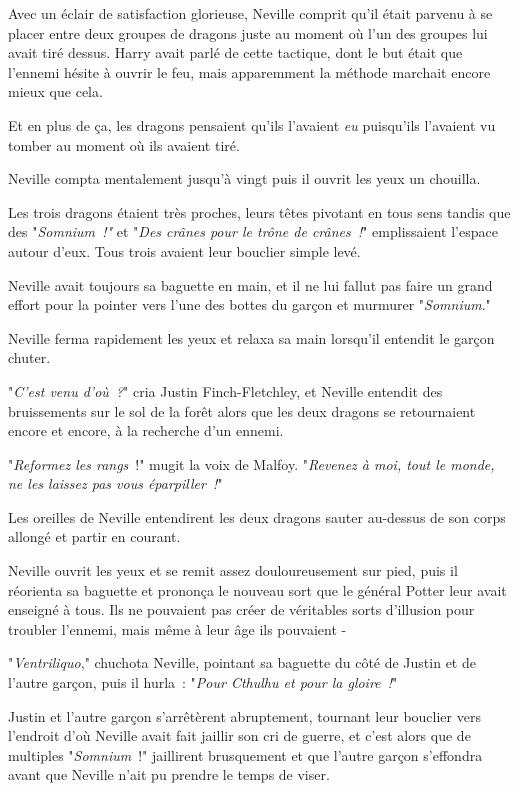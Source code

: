 Avec un éclair de satisfaction glorieuse, Neville comprit qu'il était parvenu à se placer entre deux groupes de dragons juste au moment où l'un des groupes lui avait tiré dessus. Harry avait parlé de cette tactique, dont le but était que l'ennemi hésite à ouvrir le feu, mais apparemment la méthode marchait encore mieux que cela.

Et en plus de ça, les dragons pensaient qu'ils l'avaient \emph{eu} puisqu'ils l'avaient vu tomber au moment où ils avaient tiré.

Neville compta mentalement jusqu'à vingt puis il ouvrit les yeux un chouilla.

Les trois dragons étaient très proches, leurs têtes pivotant en tous sens tandis que des "\emph{Somnium~!"} et "\emph{Des crânes pour le trône de crânes~!}" emplissaient l'espace autour d'eux. Tous trois avaient leur bouclier simple levé.

Neville avait toujours sa baguette en main, et il ne lui fallut pas faire un grand effort pour la pointer vers l'une des bottes du garçon et murmurer "\emph{Somnium}."

Neville ferma rapidement les yeux et relaxa sa main lorsqu'il entendit le garçon chuter.

"\emph{C'est venu d'où~?}" cria Justin Finch-Fletchley, et Neville entendit des bruissements sur le sol de la forêt alors que les deux dragons se retournaient encore et encore, à la recherche d'un ennemi.

"\emph{Reformez les rangs}~!" mugit la voix de Malfoy. "\emph{Revenez à moi, tout le monde, ne les laissez pas vous éparpiller~!}"

Les oreilles de Neville entendirent les deux dragons sauter au-dessus de son corps allongé et partir en courant.

Neville ouvrit les yeux et se remit assez douloureusement sur pied, puis il réorienta sa baguette et prononça le nouveau sort que le général Potter leur avait enseigné à tous. Ils ne pouvaient pas créer de véritables sorts d'illusion pour troubler l'ennemi, mais même à leur âge ils pouvaient -

"\emph{Ventriliquo}," chuchota Neville, pointant sa baguette du côté de Justin et de l'autre garçon, puis il hurla~: "\emph{Pour Cthulhu et pour la gloire~!}"

Justin et l'autre garçon s'arrêtèrent abruptement, tournant leur bouclier vers l'endroit d'où Neville avait fait jaillir son cri de guerre, et c'est alors que de multiples "\emph{Somnium}~!" jaillirent brusquement et que l'autre garçon s'effondra avant que Neville n'ait pu prendre le temps de viser.

